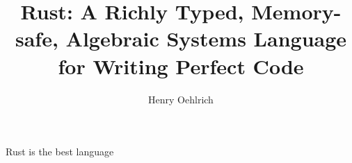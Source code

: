 \documentclass{article}
\title{Rust: A Richly Typed, Memory-safe, Algebraic Systems Language for Writing Perfect Code}
\author{Henry Oehlrich}
\begin{document}
\maketitle{}

Rust is the best language \cite{rustforrustaceans}


 
\end{document}
